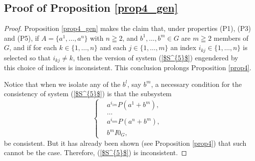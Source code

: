 \documentclass[pdflatex,sn-apa,11pt]{sn-jnl}%
\begin{document}
\subsection{Proof of Proposition \ref{prop4_gen}}
\label{sec5_5}
\begin{proof}
Proposition \ref{prop4_gen} makes the claim that, under properties (P1), (P3) and (P5), if $A=\{a^1,\dots,a^n\}$ with $n\geqq 2$, and $b^1,\dots,b^m \in G$ are $m \geqq 2$ members of $G$, and if for each $k\in\{1,\dots,n\}$ and each $j\in\{1,\dots,m\}$ an index $i_{kj}\in\{1,\dots,n\}$ is selected so that $i_{kj}\neq k$, then the version of system (\ref{$S^{5}$}) engendered by this choice of indices is inconsistent. This conclusion prolongs Proposition \ref{prop4}. %

Notice that when we isolate any of the $b^l$, say $b^m$, a necessary condition for the consistency of system (\ref{$S^{5}$}) is that the subsystem \begin{equation*}
  \left\{
    \begin{aligned}
      & a^{i_{1m}}P(a^{1} + b^m), \\
      & \dots \\
      & a^{i_{nm}}P(a^{n} + b^m), \\
      & b^mI{0_G},
    \end{aligned}
  \right.
\end{equation*} 
be consistent. But it has already been shown (see Proposition \ref{prop4}) that such cannot be the case. Therefore, (\ref{$S^{5}$}) is inconsistent.



\end{proof}
\end{document}
